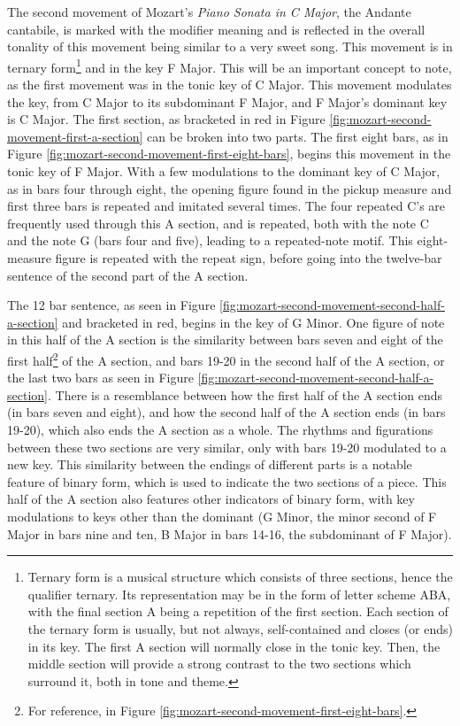The second movement of Mozart's \textit{Piano Sonata in C Major}, the Andante cantabile, is marked with the modifier  meaning  and is reflected in the overall tonality of this movement being similar to a very sweet song. This movement is in ternary form\footnote{Ternary form is a musical structure which consists of three sections, hence the qualifier ternary. Its representation may be in the form of letter scheme ABA, with the final section A being a repetition of the first section. Each section of the ternary form is usually, but not always, self-contained and closes (or ends) in its key. The first A section will normally close in the tonic key. Then, the middle section will provide a strong contrast to the two sections which surround it, both in tone and theme.} and in the key F Major. This will be an important concept to note, as the first movement was in the tonic key of C Major. This movement modulates the key, from C Major to its subdominant F Major, and F Major's dominant key is C Major. The first  section, as bracketed in red in Figure \ref{fig:mozart-second-movement-first-a-section}\autocite{Henle_1977} can be broken into two parts. The first eight bars, as in Figure \ref{fig:mozart-second-movement-first-eight-bars}\autocite{Henle_1977}, begins this movement in the tonic key of F Major. With a few modulations to the dominant key of C Major, as in bars four through eight, the opening figure found in the pickup measure and first three bars is repeated and imitated several times. The four repeated C's are frequently used through this A section, and is repeated, both with the note C and the note G (bars four and five), leading to a repeated-note motif. This eight-measure figure is repeated with the repeat sign, before going into the twelve-bar sentence of the second part of the A section. 

The 12 bar sentence, as seen in Figure \ref{fig:mozart-second-movement-second-half-a-section}\autocite{Henle_1977} and bracketed in red, begins in the key of G Minor. One figure of note in this half of the A section is the similarity between bars seven and eight of the first half\footnote{For reference, in Figure \ref{fig:mozart-second-movement-first-eight-bars}.} of the A section, and bars 19-20 in the second half of the A section, or the last two bars as seen in Figure \ref{fig:mozart-second-movement-second-half-a-section}\autocite{Henle_1977}. There is a resemblance between how the first half of the A section ends (in bars seven and eight), and how the second half of the A section ends (in bars 19-20), which also ends the A section as a whole. The rhythms and figurations between these two sections are very similar, only with bars 19-20 modulated to a new key. This similarity between the endings of different parts is a notable feature of binary form\autocite{Sutcliffe_Tilmouth_2001}, which is used to indicate the two sections of a piece. This half of the A section also features other indicators of binary form, with key modulations to keys other than the dominant (G Minor, the minor second of F Major in bars nine and ten, B\musFlat{} Major in bars 14-16, the subdominant of F Major).

